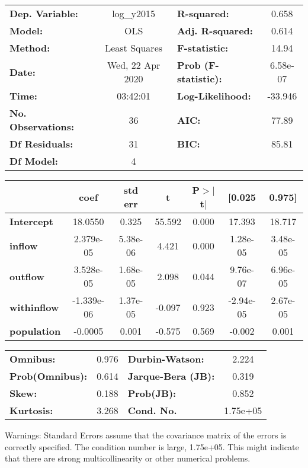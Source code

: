 \begin{center}
\begin{tabular}{lclc}
\toprule
\textbf{Dep. Variable:}    &    log\_y2015    & \textbf{  R-squared:         } &     0.658   \\
\textbf{Model:}            &       OLS        & \textbf{  Adj. R-squared:    } &     0.614   \\
\textbf{Method:}           &  Least Squares   & \textbf{  F-statistic:       } &     14.94   \\
\textbf{Date:}             & Wed, 22 Apr 2020 & \textbf{  Prob (F-statistic):} &  6.58e-07   \\
\textbf{Time:}             &     03:42:01     & \textbf{  Log-Likelihood:    } &   -33.946   \\
\textbf{No. Observations:} &          36      & \textbf{  AIC:               } &     77.89   \\
\textbf{Df Residuals:}     &          31      & \textbf{  BIC:               } &     85.81   \\
\textbf{Df Model:}         &           4      & \textbf{                     } &             \\
\bottomrule
\end{tabular}
\begin{tabular}{lcccccc}
                    & \textbf{coef} & \textbf{std err} & \textbf{t} & \textbf{P$> |$t$|$} & \textbf{[0.025} & \textbf{0.975]}  \\
\midrule
\textbf{Intercept}  &      18.0550  &        0.325     &    55.592  &         0.000        &       17.393    &       18.717     \\
\textbf{inflow}     &    2.379e-05  &     5.38e-06     &     4.421  &         0.000        &     1.28e-05    &     3.48e-05     \\
\textbf{outflow}    &    3.528e-05  &     1.68e-05     &     2.098  &         0.044        &     9.76e-07    &     6.96e-05     \\
\textbf{withinflow} &   -1.339e-06  &     1.37e-05     &    -0.097  &         0.923        &    -2.94e-05    &     2.67e-05     \\
\textbf{population} &      -0.0005  &        0.001     &    -0.575  &         0.569        &       -0.002    &        0.001     \\
\bottomrule
\end{tabular}
\begin{tabular}{lclc}
\textbf{Omnibus:}       &  0.976 & \textbf{  Durbin-Watson:     } &    2.224  \\
\textbf{Prob(Omnibus):} &  0.614 & \textbf{  Jarque-Bera (JB):  } &    0.319  \\
\textbf{Skew:}          &  0.188 & \textbf{  Prob(JB):          } &    0.852  \\
\textbf{Kurtosis:}      &  3.268 & \textbf{  Cond. No.          } & 1.75e+05  \\
\bottomrule
\end{tabular}
\end{center}

Warnings: \newline
 [1] Standard Errors assume that the covariance matrix of the errors is correctly specified. \newline
 [2] The condition number is large, 1.75e+05. This might indicate that there are \newline
 strong multicollinearity or other numerical problems.